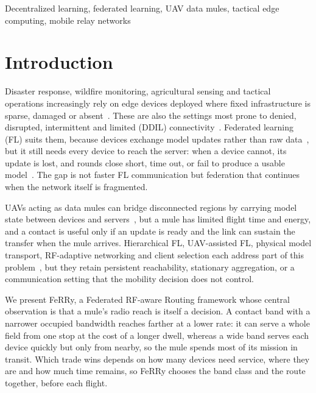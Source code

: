 \documentclass[conference]{IEEEtran}
\newcommand{\sysname}{FeRRy}
\begin{document}
\begin{IEEEkeywords}
Decentralized learning, federated learning, UAV data mules, tactical edge computing, mobile relay networks
\end{IEEEkeywords}

\section{Introduction}
\label{sec:introduction}

Disaster response, wildfire monitoring, agricultural sensing and tactical
operations increasingly rely on edge devices deployed where fixed infrastructure
is sparse, damaged or absent~\cite{zeng2016wireless, song2022comprehensive}.
These are also the settings most prone to denied, disrupted, intermittent and
limited (DDIL) connectivity~\cite{gupta2015survey}. Federated learning (FL) suits
them, because devices exchange model updates rather than raw
data~\cite{mcmahan2017communication, kostage2025hifins}, but it still needs every
device to reach the server: when a device cannot, its update is lost, and rounds
close short, time out, or fail to produce a usable model~\cite{li2020federated}.
The gap is not faster FL communication but federation that continues when the
network itself is fragmented.

UAVs acting as data mules can bridge disconnected regions by carrying model state
between devices and servers~\cite{zhang2025latency, arsalaan2024uavs}, but a mule
has limited flight time and energy, and a contact is useful only if an update is
ready and the link can sustain the transfer when the mule arrives. Hierarchical
FL, UAV-assisted FL, physical model transport, RF-adaptive networking and client
selection each address part of this problem~\cite{liu2020client, lin2023delay,
parasnis2023connectivity, yemini2023robust, mestoukirdi2022uav, bian2025indirect,
wang2018deep, cui2019multi, nishio2019client, lai2021oort}, but they retain
persistent reachability, stationary aggregation, or a communication setting that
the mobility decision does not control.

We present \sysname{}, a Federated RF-aware Routing framework whose central
observation is that a mule's radio reach is itself a decision. A contact band
with a narrower occupied bandwidth reaches farther at a lower rate: it can serve
a whole field from one stop at the cost of a longer dwell, whereas a wide band
serves each device quickly but only from nearby, so the mule spends most of its
mission in transit. Which trade wins depends on how many devices need service,
where they are and how much time remains, so \sysname{} chooses the band class
and the route together, before each flight.
\end{document}
